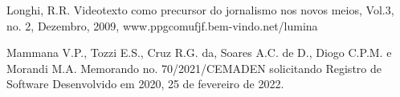 \documentclass[
12pt,		%
openright,	%
twoside,  %
a4paper,			%
chapter=TITLE,		%
english,			%
french,				%
spanish,			%
brazil				%
]{USPSC-classe/USPSC}
\begin{document}
\begin{flushleft}
\begin{flushleft}
\begin{flushleft}
\begin{flushleft}
\begin{flushleft}
\begin{flushleft}
\begin{flushleft}
\begin{flushleft}
\begin{flushleft}
[LONGHI, 2009] Longhi, R.R. Videotexto como precursor do jornalismo nos novos meios, Vol.3, no. 2, Dezembro, 2009, www.ppgcomufjf.bem-vindo.net/lumina
\end{flushleft}


\end{flushleft}


\end{flushleft}


\end{flushleft}


\end{flushleft}


\end{flushleft}


\end{flushleft}


\end{flushleft}


\end{flushleft}


\begin{flushleft}
\begin{flushleft}
\begin{flushleft}
\begin{flushleft}
\begin{flushleft}
\begin{flushleft}
\begin{flushleft}
\begin{flushleft}
\begin{flushleft}
[MAMMANA et al., 2022] Mammana V.P., Tozzi E.S., Cruz R.G. da, Soares A.C. de D., Diogo C.P.M. e Morandi M.A. Memorando no. 70/2021/CEMADEN solicitando Registro de Software Desenvolvido em 2020, 25 de fevereiro de 2022.
\end{flushleft}


\end{flushleft}


\end{flushleft}


\end{flushleft}


\end{flushleft}


\end{flushleft}


\end{flushleft}


\end{flushleft}


\end{flushleft}
\end{document}
